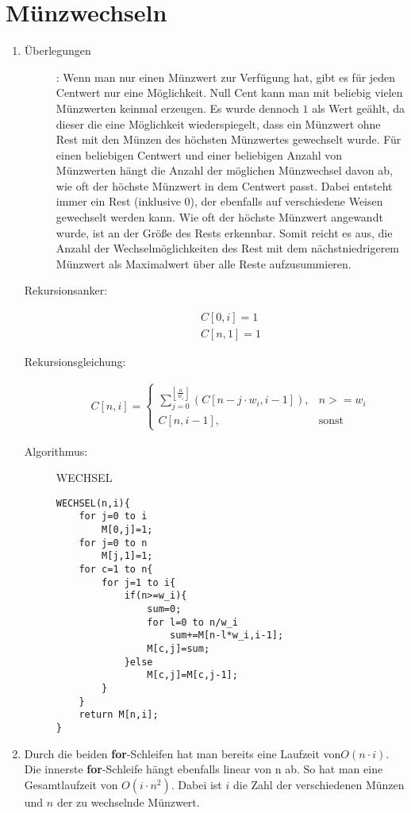 \documentclass[a4paper,10pt]{article}
\begin{document}
\section{Münzwechseln}
\begin{enumerate}
	\item \begin{description}
		\item[Überlegungen]: Wenn man nur einen Münzwert zur Verfügung hat, gibt es für jeden Centwert nur eine Möglichkeit. Null Cent kann man mit beliebig vielen Münzwerten keinmal erzeugen. Es wurde dennoch $1$ als Wert geählt, da dieser die eine Möglichkeit wiederspiegelt, dass ein Münzwert ohne Rest mit den Münzen des höchsten Münzwertes gewechselt wurde. Für einen beliebigen Centwert und einer beliebigen Anzahl von Münzwerten hängt die Anzahl der möglichen Münzwechsel davon ab, wie oft der höchste Münzwert in dem Centwert passt. Dabei entsteht immer ein Rest (inklusive $0$), der ebenfalls auf verschiedene Weisen gewechselt werden kann. Wie oft der höchste Münzwert angewandt wurde, ist an der Größe des Rests erkennbar. Somit reicht es aus, die Anzahl der Wechselmöglichkeiten des Rest mit dem nächstniedrigerem Münzwert als Maximalwert über alle Reste aufzusummieren.
		\item[Rekursionsanker:] \begin{align*}
			C[0,i] = 1\\
			C[n,1] = 1
			\end{align*}
		\item[Rekursionsgleichung:] \begin{align*}
			C[n,i] = \begin{cases}
				\sum\limits_{j=0}^{\left\lfloor\frac{n}{w_i}\right\rfloor}\left( C[n-j\cdot w_i, i-1]\right), & n >=w_i \\
				C[n,i-1], & \text{sonst}
			\end{cases}
			\end{align*}
		\item[Algorithmus:] WECHSEL\begin{lstlisting}[mathescape=true]
WECHSEL(n,i){
	for j=0 to i
		M[0,j]=1;
	for j=0 to n
		M[j,1]=1;
	for c=1 to n{
		for j=1 to i{
			if(n>=w_i){
				sum=0;
				for l=0 to n/w_i
					sum+=M[n-l*w_i,i-1];
				M[c,j]=sum;
			}else
				M[c,j]=M[c,j-1];
		}
	}
	return M[n,i];
}
			\end{lstlisting}
		\end{description}
	\item Durch die beiden \textbf{for}-Schleifen hat man bereits eine Laufzeit von$O(n\cdot i)$. Die innerste \textbf{for}-Schleife hängt ebenfalls linear von n ab. So hat man eine Gesamtlaufzeit von $O(i\cdot n^2)$. Dabei ist $i$ die Zahl der verschiedenen Münzen und $n$ der zu wechselnde Münzwert.
\end{enumerate}
\end{document}

